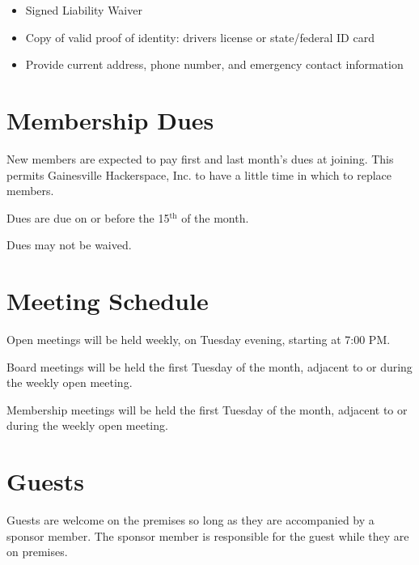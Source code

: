 \documentclass[10pt,letterpaper,titlepage]{article}
\newcommand\corpname{Gainesville Hackerspace, Inc.}
\newcommand{\superscript}[1]{\ensuremath{^{\textrm{#1}}}}
\renewcommand{\th}[0]{\superscript{th}}
\begin{document}
\begin{itemize}
    \item Signed Liability Waiver
    \item Copy of valid proof of identity: drivers license or state/federal ID 
    card
    \item Provide current address, phone number, and emergency contact 
    information
\end{itemize}

\section{Membership Dues}
\label{dues}

New members are expected to pay first and last month's dues at joining. This
permits \corpname{} to have a little time in which to replace members.

Dues are due on or before the 15\th{} of the month.

Dues may not be waived.

\section{Meeting Schedule}

Open meetings will be held weekly, on Tuesday evening, starting at 7:00 PM.

Board meetings will be held the first Tuesday of the month, adjacent
to or during the weekly open meeting.

Membership meetings will be held the first Tuesday of the month,
adjacent to or during the weekly open meeting.

\section{Guests}
Guests are welcome on the premises so long as they are accompanied by a sponsor
member. The sponsor member is responsible for the guest while they are on
premises.
\end{document}
